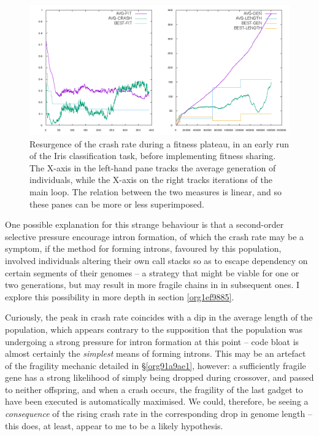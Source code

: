 \documentclass[12pt,glossary]{dalthesis}
\begin{document}
\begin{figure}[htbp]
\centering
\includegraphics[width=.9\linewidth]{../images/plots/good-nosharing.png}
\caption{\label{fig:org7cac4d7}
Resurgence of the crash rate during a fitness plateau, in an early run of the Iris classification task, before implementing fitness sharing. The X-axis in the left-hand pane tracks the average generation of individuals, while the X-axis on the right tracks iterations of the main loop. The relation between the two measures is linear, and so these panes can be more or less superimposed.}
\end{figure}

One possible explanation for this strange behaviour is that a second-order selective
pressure encourage intron formation, of which the crash rate may be a symptom,
if the method for forming introns, favoured by this population, involved individuals
altering their own call stacks so as to escape dependency on certain segments of their
genomes -- a strategy that might be viable for one or two generations, but may result
in more fragile chains in in subsequent ones. I explore this possibility in more
depth in section \ref{org1ef9885}.

Curiously, the peak in crash rate coincides with a dip in the average length of the
population, which appears contrary to the supposition that the population was undergoing
a strong pressure for intron formation at this point -- code bloat is almost certainly
the \emph{simplest} means of forming introns. This may be an artefact of the fragility
mechanic detailed in \S \ref{org91a9ae1}, however: a sufficiently fragile gene
has a strong likelihood of simply being dropped during crossover, and passed to neither
offspring, and when a crash occurs, the fragility of the last gadget to have been
executed is automatically maximised. We could, therefore, be seeing a \emph{consequence}
of the rising crash rate in the corresponding drop in genome length -- this does, at
least, appear to me to be a likely hypothesis.
\end{document}
